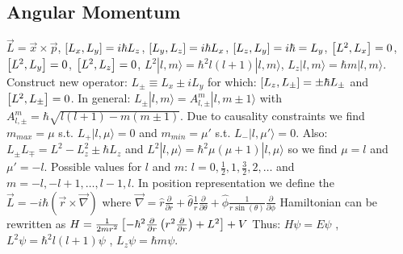 \subsection{Angular Momentum}
$\vec{L} = \vec{x} \times \vec{p}$, $\left[ L_x , L_y \right] = i \hbar L_z$,
$\left[ L_y , L_z \right] = i \hbar L_x$, $\left[ L_z , L_y \right] = i \hbar = L_y$,
$\left[ L^2 , L_x \right] = 0$, $\left[ L^2 , L_y \right] = 0$,
$\left[ L^2 , L_z \right] = 0$, $L^2 | l,m \rangle = \hbar^2 l (l+1) | l,m \rangle$,
$L_z | l,m \rangle = \hbar m | l,m \rangle$.
Construct new operator:
$L_{\pm} \equiv L_x \pm i L_y$ for which:
$\left[ L_z , L_{\pm} \right] = \pm \hbar L_{\pm}$ and
$\left[ L^2 , L_{\pm} \right] = 0$. In general:
$L_{\pm} |l,m \rangle = A_{l,\pm}^m |l,m \pm 1 \rangle$ with
$A_{l,\pm}^m = \hbar \sqrt{l(l+1) - m(m \pm 1)}$.
Due to causality constraints we find
$m_{max} = \mu$ s.t. $L_+ |l,\mu \rangle = 0$ and
$m_{min} = \mu'$ s.t. $L_- |l,\mu' \rangle = 0$. Also:
$L_{\pm} L_{\mp} = L^2 - L_z^2 \pm \hbar L_z$ and
$L^2 |l,\mu \rangle = \hbar^2 \mu (\mu + 1) |l,\mu \rangle$
so we find $\mu = l$ and $\mu' = - l$. Possible values for $l$ and $m$:
$l = 0,\frac{1}{2},1,\frac{3}{2},2,\dots$ and $m=-l,-l+1,\dots,l-1,l$.
In position representation we define the 
$\vec{L} = -i \hbar (\vec{r} \times \vec{\nabla})$ where
$\vec{\nabla} = \hat{r} \frac{\partial}{\partial r} + \hat{\theta} \frac{1}{r}
\frac{\partial}{\partial \theta} + \hat{\phi} \frac{1}{r \sin(\theta)} \frac{\partial}{\partial \phi}$
Hamiltonian can be rewritten as
$H = \frac{1}{2 m r^2} \left[ - \hbar^2 \frac{\partial}{\partial r} \left( r^2 \frac{\partial}{\partial r} \right) + L^2 \right] + V$
Thus: $H \psi = E \psi$ , $L^2 \psi = \hbar^2 l(l+1) \psi$ , $L_z \psi = \hbar m \psi$.


